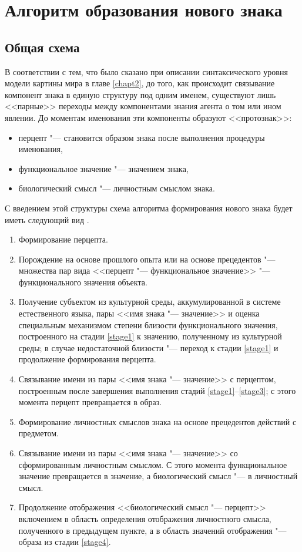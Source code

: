 \section{Алгоритм образования нового знака} \label{sect3_3}

\subsection{Общая схема}

В соответствии с тем, что было сказано при описании синтаксического уровня модели картины мира в главе \ref{chapt2}, до того, как происходит связывание компонент знака в единую структуру под одним именем, существуют лишь <<парные>> переходы между компонентами знания агента о том или ином явлении. До моментам именования эти компоненты образуют <<протознак>>:
\begin{itemize}
	\item перцепт "--- становится образом знака после выполнения процедуры именования,
	\item функциональное значение "--- значением знака,
	\item биологический смысл "--- личностным смыслом знака.
	\end{itemize}
	
С введением этой структуры схема алгоритма формирования нового знака будет иметь следующий вид \cite{PanovA2014a}.

\begin{enumerate}
	\label{new_sign_alg}
	\renewcommand\labelenumi{\theenumi .}
	\item\label{stage1} Формирование перцепта.
	\item\label{stage2} Порождение на основе прошлого опыта или на основе прецедентов "--- множества пар вида <<перцепт "--- функциональное значение>> "--- функционального значения объекта.
	\item\label{stage3} Получение субъектом из культурной среды, аккумулированной в системе естественного языка, пары <<имя знака "--- значение>> и оценка специальным механизмом степени близости функционального значения, построенного на стадии \ref{stage1} к значению, полученному из культурной среды; в случае недостаточной близости "--- переход к стадии \ref{stage1} и продолжение формирования перцепта.
	\item\label{stage4} Связывание имени из пары <<имя знака "--- значение>> с перцептом, построенным после завершения выполнения стадий \ref{stage1}--\ref{stage3}; с этого момента перцепт превращается в образ.
	\item Формирование личностных смыслов знака на основе прецедентов действий с предметом.
	\item Связывание имени из пары <<имя знака "--- значение>> со сформированным личностным смыслом. С этого момента функциональное значение превращается в значение, а биологический смысл "--- в личностный смысл.
	\item Продолжение отображения <<биологический смысл "--- перцепт>> включением в область определения отображения личностного смысла, полученного в предыдущем пункте, а в область значений отображения "--- образа из стадии \ref{stage4}.
\end{enumerate}

